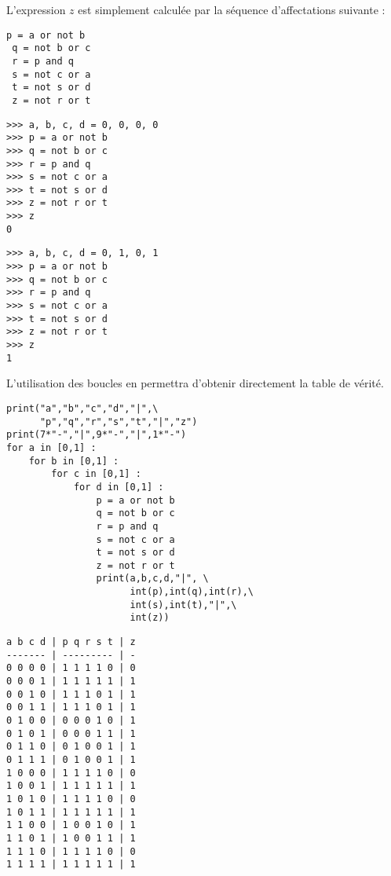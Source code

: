 L'expression $z$ est simplement calculée par la séquence d'affectations suivante :
\vspace*{2mm}

\begin{minipage}{4cm}
\begin{Verbatim}[frame=single]
 p = a or not b
 q = not b or c
 r = p and q
 s = not c or a
 t = not s or d
 z = not r or t
\end{Verbatim}
\end{minipage}
\hfill
\begin{minipage}{5cm}\footnotesize
\begin{Verbatim}
>>> a, b, c, d = 0, 0, 0, 0
>>> p = a or not b
>>> q = not b or c
>>> r = p and q
>>> s = not c or a
>>> t = not s or d
>>> z = not r or t
>>> z
0
\end{Verbatim}
\end{minipage}
\hfill
\begin{minipage}{5cm}\footnotesize
\begin{Verbatim}
>>> a, b, c, d = 0, 1, 0, 1
>>> p = a or not b
>>> q = not b or c
>>> r = p and q
>>> s = not c or a
>>> t = not s or d
>>> z = not r or t
>>> z
1
\end{Verbatim}
\end{minipage}

\newpage
L'utilisation des boucles en \python{} permettra d'obtenir directement la table de vérité.

\noindent
\begin{minipage}[t]{10cm}\footnotesize
\begin{lstlisting}
print("a","b","c","d","|",\
      "p","q","r","s","t","|","z")
print(7*"-","|",9*"-","|",1*"-")
for a in [0,1] :
    for b in [0,1] :
        for c in [0,1] :
            for d in [0,1] :
                p = a or not b
                q = not b or c
                r = p and q
                s = not c or a
                t = not s or d
                z = not r or t
                print(a,b,c,d,"|", \
                      int(p),int(q),int(r),\
                      int(s),int(t),"|",\
                      int(z))
\end{lstlisting}
\end{minipage}
\hfill
\begin{minipage}[t]{4cm}\footnotesize
\begin{Verbatim}
a b c d | p q r s t | z
------- | --------- | -
0 0 0 0 | 1 1 1 1 0 | 0
0 0 0 1 | 1 1 1 1 1 | 1
0 0 1 0 | 1 1 1 0 1 | 1
0 0 1 1 | 1 1 1 0 1 | 1
0 1 0 0 | 0 0 0 1 0 | 1
0 1 0 1 | 0 0 0 1 1 | 1
0 1 1 0 | 0 1 0 0 1 | 1
0 1 1 1 | 0 1 0 0 1 | 1
1 0 0 0 | 1 1 1 1 0 | 0
1 0 0 1 | 1 1 1 1 1 | 1
1 0 1 0 | 1 1 1 1 0 | 0
1 0 1 1 | 1 1 1 1 1 | 1
1 1 0 0 | 1 0 0 1 0 | 1
1 1 0 1 | 1 0 0 1 1 | 1
1 1 1 0 | 1 1 1 1 0 | 0
1 1 1 1 | 1 1 1 1 1 | 1
\end{Verbatim}
\end{minipage}


